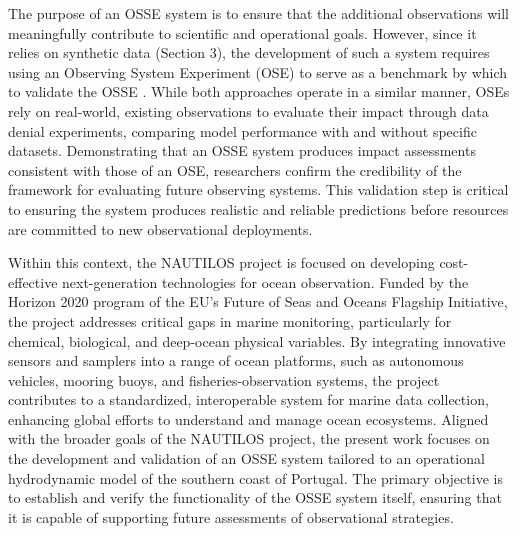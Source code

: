 The purpose of an OSSE system is to ensure that the additional observations will meaningfully contribute to scientific and operational goals. However, since it relies on synthetic data (Section 3), the development of such a system requires using an Observing System Experiment (OSE) to serve as a benchmark by which to validate the OSSE \parencite{halliwell2014Rigorous}. While both approaches operate in a similar manner, OSEs rely on real-world, existing observations to evaluate their impact through data denial experiments, comparing model performance with and without specific datasets. Demonstrating that an OSSE system produces impact assessments consistent with those of an OSE, researchers confirm the credibility of the framework for evaluating future observing systems. This validation step is critical to ensuring the system produces realistic and reliable predictions before resources are committed to new observational deployments.

Within this context, the NAUTILOS project \parencite{novellino2022new} is focused on developing cost-effective next-generation technologies for ocean observation. Funded by the Horizon 2020 program of the EU's Future of Seas and Oceans Flagship Initiative, the project addresses critical gaps in marine monitoring, particularly for chemical, biological, and deep-ocean physical variables. By integrating innovative sensors and samplers into a range of ocean platforms, such as autonomous vehicles, mooring buoys, and fisheries-observation systems, the project contributes to a standardized, interoperable system for marine data collection, enhancing global efforts to understand and manage ocean ecosystems. Aligned with the broader goals of the NAUTILOS project, the present work focuses on the development and validation of an OSSE system tailored to an operational hydrodynamic model of the southern coast of Portugal. The primary objective is to establish and verify the functionality of the OSSE system itself, ensuring that it is capable of supporting future assessments of observational strategies.

